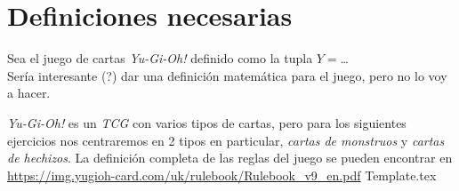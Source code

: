 \section{Definiciones necesarias}
  Sea el juego de cartas \textit{Yu-Gi-Oh!} definido como la tupla 
  $Y = $\dots\\
  Sería interesante (?) dar una definición matemática para el juego, pero no lo voy a 
  hacer.

  \textit{Yu-Gi-Oh!} es un \textit{TCG} con varios tipos de cartas, pero para los 
  siguientes ejercicios nos centraremos en 2 tipos en particular, \textit{cartas de 
  monstruos} y \textit{cartas de hechizos}.
  La definición completa de las reglas del juego se pueden encontrar en 
  \url{https://img.yugioh-card.com/uk/rulebook/Rulebook_v9_en.pdf}
%
{Template.tex} 